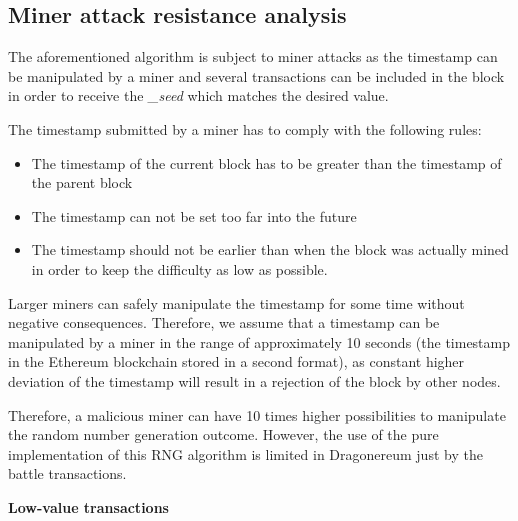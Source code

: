 \documentclass[12pt]{article}
\begin{document}
\vspace{\baselineskip}
\subsection{Miner attack resistance analysis}
\label{Miner attack resistance analysis}  \par

The aforementioned algorithm is subject to miner attacks as the timestamp can be manipulated by a miner and several transactions can be included in the block in order to receive the \textit{\_seed }which matches the desired value.\par

The timestamp submitted by a miner has to comply with the following rules:\par

\begin{itemize}
	\item The timestamp of the current block has to be greater than the timestamp of the parent block\par

	\item The timestamp can not be set too far into the future\par

	\item The timestamp should not be earlier than when the block was actually mined in order to keep the difficulty as low as possible.
\end{itemize}\par

Larger miners can safely manipulate the timestamp for some time without negative consequences. Therefore, we assume that a timestamp can be manipulated by a miner in the range of approximately 10 seconds (the timestamp in the Ethereum blockchain stored in a second format), as constant higher deviation of the timestamp will result in a rejection of the block by other nodes. \par

Therefore, a malicious miner can have 10 times higher possibilities to manipulate the random number generation outcome. However, the use of the pure implementation of this RNG algorithm is limited in Dragonereum just by the battle transactions.\par

\begin{justify}
\textbf{Low-value transactions}
\end{justify}\par
\end{document}
